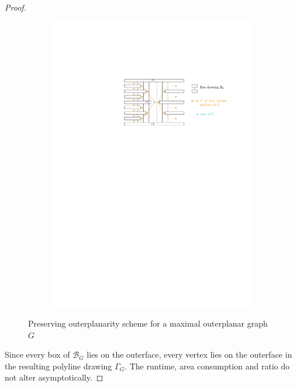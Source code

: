 \begin{proof}
\begin{figure}[H]
	\begin{subfigure}{\textwidth}
		\centering
		\includegraphics[page=1,width=\linewidth]{graphics/maximal_outerplanar_preserving_outerplanartiy_scheme.pdf}
	\end{subfigure}
	\caption{Preserving outerplanarity scheme for a maximal outerplanar graph $G$}\label{im:maximal_outerplanar_preserving_outerplanartiy_scheme}
\end{figure}
Since every box of $\mathcal{B}_{G}$ lies on the outerface, every vertex lies on the outerface in the resulting polyline drawing $\Gamma_{G}$. The runtime, area consumption and ratio do not alter asymptotically.
\end{proof}
